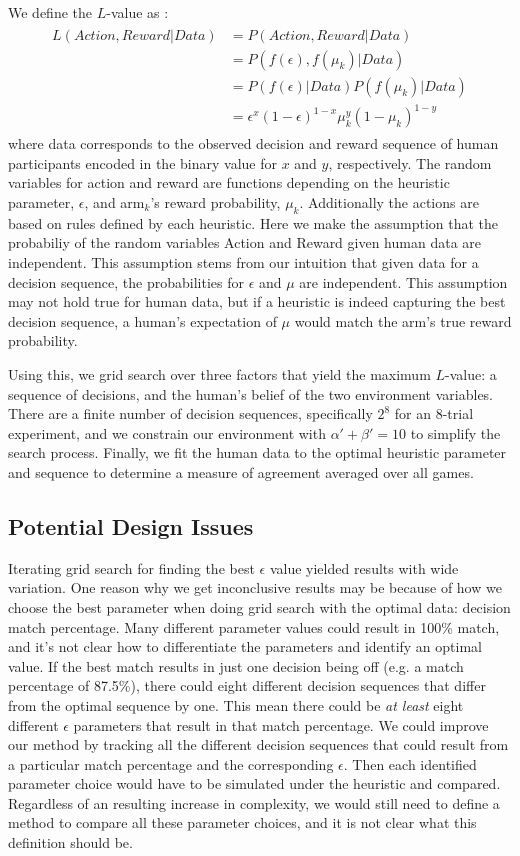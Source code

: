 We define the $L$-value as :
\begin{align}
\begin{split}
	\label{eq:likelihood} 
	L(Action,Reward|Data) &= P(Action,Reward|Data) \\
						  &= P(f(\epsilon),f(\mu_k)|Data) \\
						  &= P(f(\epsilon)|Data) P(f(\mu_k)|Data) \\	
						  &= \epsilon^x (1-\epsilon)^{1-x} \mu_k^y (1-\mu_k)^{1-y}
\end{split}
\end{align}
where data corresponds to the observed decision and reward sequence of human participants encoded in the binary value for $x$ and $y$, respectively. The random variables for action and reward are functions depending on the heuristic parameter, $\epsilon$, and arm$_k$'s reward probability, $\mu_k$. Additionally the actions are based on rules defined by each heuristic. Here we make the assumption that the probabiliy of the random variables Action and Reward given human data are independent. This assumption stems from our intuition that given data for a decision sequence, the probabilities for $\epsilon$ and $\mu$ are independent. This assumption may not hold true for human data, but if a heuristic is indeed capturing the best decision sequence, a human's expectation of $\mu$ would match the arm's true reward probability.

Using this, we grid search over three factors that yield the maximum $L$-value: a sequence of decisions, and the human's belief of the two environment variables. There are a finite number of decision sequences, specifically $2^8$ for an 8-trial experiment, and we constrain our environment with $\alpha'+\beta'=10$ to simplify the search process. Finally, we fit the human data to the optimal heuristic parameter and sequence to determine a measure of agreement averaged over all games.

\subsection{Potential Design Issues}
Iterating grid search for finding the best $\epsilon$ value yielded results with wide variation. One reason why we get inconclusive results may be because of how we choose the best parameter when doing grid search with the optimal data: decision match percentage. Many different parameter values could result in 100\% match, and it's not clear how to differentiate the parameters and identify an optimal value. If the best match results in just one decision being off (e.g. a match percentage of 87.5\%), there could eight different decision sequences that differ from the optimal sequence by one. This mean there could be \textit{at least} eight different $\epsilon$ parameters that result in that match percentage. We could improve our method by tracking all the different decision sequences that could result from a particular match percentage and the corresponding $\epsilon$. Then each identified parameter choice would have to be simulated under the heuristic and compared. Regardless of an resulting increase in complexity, we would still need to define a method to compare all these parameter choices, and it is not clear what this definition should be.

